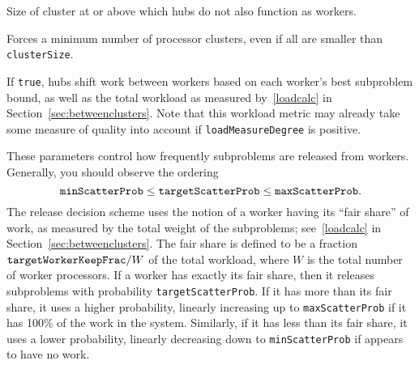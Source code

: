 Size of cluster at or above which hubs do not also function as workers.
 
Forces a minimum number of processor clusters, even if all are smaller than
\texttt{clusterSize}. 

If \texttt{true}, hubs shift work between workers based on each
worker's best subproblem bound,
as well as the total workload as measured by~\eqref{loadcalc} in
Section~\ref{sec:betweenclusters}.  Note that this workload metric
may already take some measure of quality into account if
\texttt{loadMeasureDegree} is positive.

\groupparams
{}
\groupparams
{}
\groupparams
{}
These parameters control how frequently subproblems are released from
workers.  Generally, you should observe the ordering
$$
\text{\texttt{minScatterProb}} \leq
\text{\texttt{targetScatterProb}} \leq
\text{\texttt{maxScatterProb}}.
$$ 
The release decision scheme uses the notion of a worker having its
``fair share'' of work, as measured by the total weight of the
subproblems; see~\eqref{loadcalc} in
Section~\ref{sec:betweenclusters}.  The fair share is defined to be a
fraction $\text{\texttt{targetWorkerKeepFrac}}/W$ of the total
workload, where $W$ is the total number of worker processors.  If a
worker has exactly its fair share, then it releases subproblems with
probability \texttt{targetScatterProb}.  If it has more than its fair
share, it uses a higher probability, linearly increasing up to
\texttt{maxScatterProb} if it has 100\% of the work in the system.
Similarly, if it has less than its fair share, it uses a lower
probability, linearly decreasing down to \texttt{minScatterProb} if
appears to have no work.


